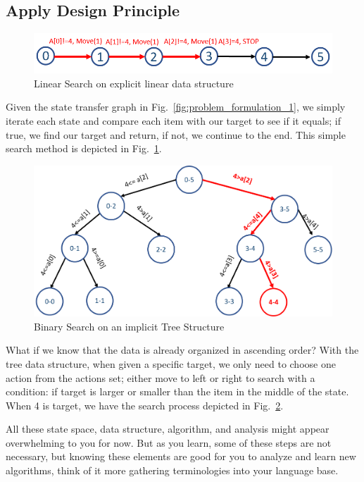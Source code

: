 \documentclass[../main.tex]{subfiles}
\begin{document}
 \subsection{Apply Design Principle} 
\begin{figure}[!ht]
    \centering
    \includegraphics[width=0.9\columnwidth]{fig/problem_formulation_1_1.png}
    \caption{Linear Search on explicit linear data structure }
    \label{fig:problem_formulation_3}
\end{figure}
Given the state transfer graph in Fig.~\ref{fig:problem_formulation_1}, we simply iterate each state and compare each item with our target to see if it equals; if true, we find our target and return, if not, we continue to the end. This simple search method is depicted in Fig.~\ref{fig:problem_formulation_3}.
\begin{figure}[!ht]
    \centering
    \includegraphics[width=0.7\columnwidth]{fig/problem_formulation_4.png}
    \caption{Binary Search on an implicit Tree Structure}
    \label{fig:problem_formulation_4}
\end{figure}
What if we know that the data is already organized in ascending order? With the tree data structure, when given a specific target, we only need to choose one action from the actions set; either move to left or right to search with a condition: if target is larger or smaller than the item in the middle of the state. When 4 is target, we have the search process depicted in  Fig.~\ref{fig:problem_formulation_4}. 

All these state space, data structure, algorithm, and analysis might appear overwhelming to you for now. But as you learn, some of these steps are not necessary, but knowing these elements are good for you to analyze and learn new algorithms, think of it more gathering terminologies into your language base. 
\end{document}
